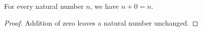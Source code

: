 \begin{theorem}
  \label{thm:blueprint-example-add-zero}
  \leanok
  For every natural number $n$, we have $n+0=n$.
\end{theorem}

\begin{proof}
  \leanok
  Addition of zero leaves a natural number unchanged.
\end{proof}
